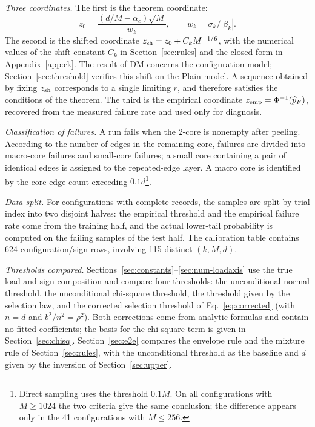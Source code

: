 \emph{Three coordinates.} The first is the theorem coordinate:
\begin{equation*}
z_0=\frac{(d/M-\alpha_c)\sqrt M}{w_k},\qquad w_k=\sigma_k/|\beta_k|.
\end{equation*}
The second is the shifted coordinate $z_{\rm sh}=z_0+C_kM^{-1/6}$, with the numerical values
of the shift constant $C_k$ in Section~\ref{sec:rules} and the closed form in
Appendix~\ref{app:ck}. The result of DM concerns the configuration model;
Section~\ref{sec:threshold} verifies this shift on the Plain model. A sequence obtained by
fixing $z_{\rm sh}$ corresponds to a single limiting $r$, and therefore satisfies the
conditions of the theorem. The third is the empirical coordinate $z_{\rm emp}=\Phi^{-1}(\widehat p_F)$,
recovered from the measured failure rate and used only for diagnosis.

\emph{Classification of failures.} A run fails when the 2-core is nonempty after peeling.
According to the number of edges in the remaining core, failures are divided into macro-core
failures and small-core failures; a small core containing a pair of identical edges is
assigned to the repeated-edge layer. A macro core is identified by the core edge count
exceeding $0.1d$\footnote{Direct sampling uses the threshold $0.1M$. On all configurations
with $M\ge1024$ the two criteria give the same conclusion; the difference appears only in the
41 configurations with $M\le256$.}.

\emph{Data split.} For configurations with complete records, the samples are split by trial
index into two disjoint halves: the empirical threshold and the empirical failure rate come
from the training half, and the actual lower-tail probability is computed on the failing
samples of the test half. The calibration table contains 624 configuration/sign rows,
involving 115 distinct $(k,M,d)$.

\emph{Thresholds compared.} Sections~\ref{sec:constants}--\ref{sec:num-loadaxis} use the true
load and sign composition and compare four thresholds: the unconditional normal threshold,
the unconditional chi-square threshold, the threshold given by the selection law, and the
corrected selection threshold of Eq.~\eqref{eq:corrected} (with $n=d$ and
$b^2/n^2=\rho^2$). Both corrections come from analytic formulas and contain no fitted
coefficients; the basis for the chi-square term is given in Section~\ref{sec:chisq}.
Section~\ref{sec:e2e} compares the envelope rule and the mixture rule of
Section~\ref{sec:rules}, with the unconditional threshold as the baseline and $d$ given by the
inversion of Section~\ref{sec:upper}.
